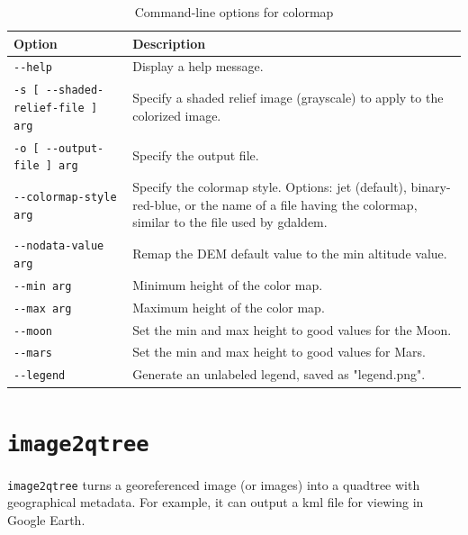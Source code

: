 \begin{longtable}{|l|p{10cm}|}
\caption{Command-line options for colormap}
\label{tbl:colormap}
\endfirsthead
\endhead
\endfoot
\endlastfoot
\hline
Option & Description \\ \hline \hline
\verb#--help# & Display a help message. \\ \hline
\verb#-s [ --shaded-relief-file ] arg# & Specify a shaded relief image (grayscale) to apply to the colorized image. \\ \hline
\verb#-o [ --output-file ] arg# & Specify the output file. \\ \hline
\verb#--colormap-style arg# & Specify the colormap style. Options: jet (default), binary-red-blue, or the name of a file having the colormap, similar to the file used by gdaldem. \\ \hline
\verb#--nodata-value arg# & Remap the DEM default value to the min altitude value. \\ \hline
\verb#--min arg# & Minimum height of the color map. \\ \hline
\verb#--max arg# & Maximum height of the color map. \\ \hline
\verb#--moon# & Set the min and max height to good values for the Moon. \\ \hline
\verb#--mars# & Set the min and max height to good values for Mars. \\ \hline
\verb#--legend# & Generate an unlabeled legend, saved as "legend.png". \\ \hline

\end{longtable}


\section{{\tt image2qtree}}\label{sec:image2qtree}

\verb#image2qtree# turns a georeferenced image (or images) into a quadtree with geographical metadata.  For example, it can output a kml file for viewing in Google Earth.


